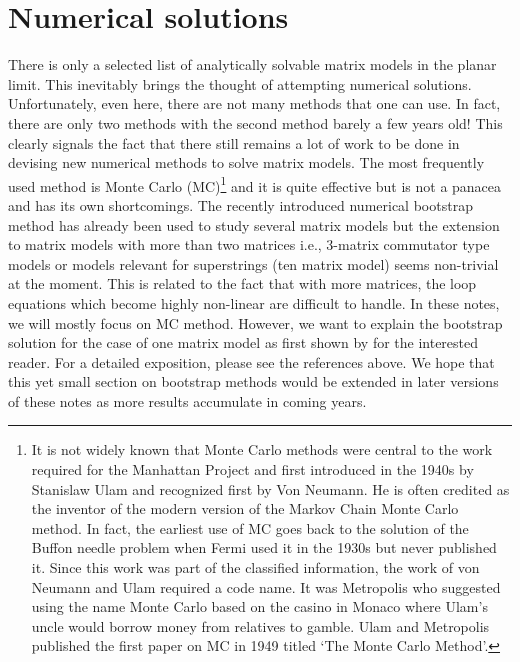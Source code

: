 \documentclass[letter,11pt]{article}
\begin{document}
\section{\label{sec:NSOL}Numerical solutions} 
There is only a selected list of analytically solvable matrix models in the planar limit. This inevitably brings 
the thought of attempting numerical solutions. Unfortunately, even here, there are not many methods that one can use. In fact, there are only two methods with the second method barely a few years old! This clearly signals the fact that there still remains a lot of work to be done in devising new numerical 
methods to solve matrix models. The most frequently used method is Monte Carlo (MC)\footnote{
It is not widely known that Monte Carlo methods were central to the work required for the Manhattan Project
and first introduced in the 1940s by Stanislaw Ulam and recognized first by Von Neumann. 
He is often credited as the inventor of the modern version of the Markov Chain Monte Carlo 
method. In fact, the earliest use of MC goes back to the solution of the Buffon needle problem when Fermi used it in the 
1930s but never published it. 
Since this work was part of the classified information, the work of von Neumann and Ulam required a code name. It was Metropolis who 
suggested using the name Monte Carlo based on the casino in 
Monaco where Ulam's uncle would borrow money from relatives to gamble. Ulam and Metropolis
published the first paper on MC in 1949 titled `The Monte Carlo Method'.} 
and it is quite effective but is not a panacea and has its own shortcomings. 
The recently introduced numerical bootstrap method has already been used to study several matrix models \cite{Anderson:2016rcw,Lin:2020mme,Han:2020bkb,Kazakov:2021lel} but the extension to matrix models with more than two matrices i.e., 3-matrix commutator type models or models relevant for superstrings (ten matrix model) seems non-trivial at the moment. This is related to the fact that with more matrices, the loop equations which become highly non-linear are difficult to handle. In these notes, we will mostly focus on MC method. However, we want to explain the bootstrap solution for the case of one matrix model as first shown by \cite{Lin:2020mme} for the interested reader. For a detailed exposition, please see the references above. We hope that this yet small section on bootstrap methods would be extended in later versions of these notes as more results accumulate in coming years. 

\end{document}
